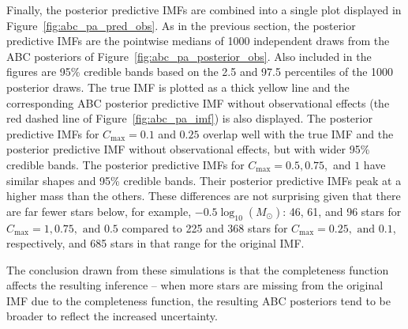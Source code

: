 \documentclass[ejs]{imsart}
\numberwithin{equation}{section}
\theoremstyle{plain}
\newcommand{\Msun}{M_{\odot}}
\newcommand{\Cmax}{C_{\text{max}}}
\begin{document}
Finally, the posterior predictive IMFs are combined into a single plot displayed in Figure~\ref{fig:abc_pa_pred_obs}.  As in the previous section, the posterior predictive IMFs are the pointwise medians of 1000 independent draws from the ABC posteriors of Figure~\ref{fig:abc_pa_posterior_obs}.  Also included in the figures are 95\% credible bands based on the 2.5 and 97.5 percentiles of the 1000 posterior draws.  The true IMF is plotted as a thick yellow line and the corresponding ABC posterior predictive IMF without observational effects (the red dashed line of Figure~\ref{fig:abc_pa_imf}) is also displayed.
The posterior predictive IMFs for $\Cmax = 0.1$ and $0.25$ overlap well with the true IMF and the posterior predictive IMF without observational effects, but with wider 95\% credible bands.
The posterior predictive IMFs for $\Cmax = 0.5, 0.75,$ and $1$ have similar shapes and 95\% credible bands.  
Their posterior predictive IMFs peak at a higher mass than the others.  These differences are not surprising given that there are far fewer stars below, for example, $-0.5 \log_{10}(\Msun)$:  
46, 61, and 96 stars for $\Cmax = 1, 0.75, \text{ and } 0.5$ compared to 225 and 368 stars for $\Cmax = 0.25, \text{ and } 0.1$, respectively, and 685 stars in that range for the original IMF.

The conclusion drawn from these simulations is that the completeness function affects the resulting inference -- when more stars are missing from the original IMF due to the completeness function, the resulting ABC posteriors tend to be broader to reflect the increased uncertainty. 
\end{document}
